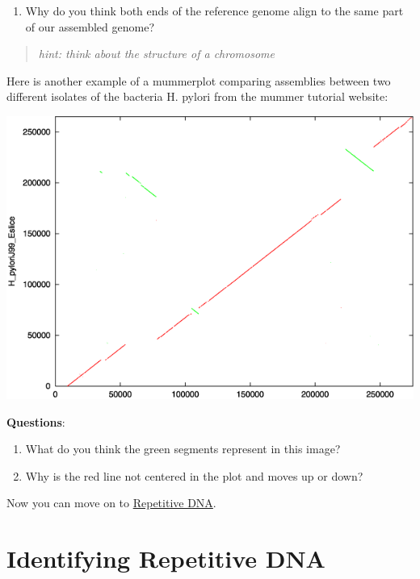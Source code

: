 \documentclass[11pt]{article}
\providecommand{\tightlist}{%
      \setlength{\itemsep}{0pt}\setlength{\parskip}{0pt}}
\begin{document}
\begin{enumerate}
\def\labelenumi{\arabic{enumi}.}
\setcounter{enumi}{1}
\tightlist
\item
  Why do you think both ends of the reference genome align to the same
  part of our assembled genome?
\end{enumerate}

\begin{quote}
\textit{hint: think about the structure of a chromosome}
\end{quote}

Here is another example of a mummerplot comparing assemblies between two
different isolates of the bacteria H. pylori from the mummer tutorial
website:

\includegraphics{images/MUMMER_2.png}

\textbf{Questions}:

\begin{enumerate}
\def\labelenumi{\arabic{enumi}.}
\tightlist
\item
  What do you think the green segments represent in this image?
\item
  Why is the red line not centered in the plot and moves up or down?
\end{enumerate}

Now you can move on to \href{repetitive_dna.ipynb}{Repetitive DNA}.





\newpage





    \hypertarget{identifying-repetitive-dna}{%
\section{Identifying Repetitive DNA}\label{identifying-repetitive-dna}}
\end{document}
